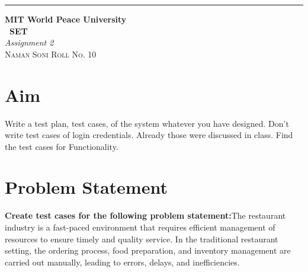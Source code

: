 \documentclass{article}
\begin{document}
\begin{titlepage} %
	
	\raggedleft\rule{1pt}{\textheight} %
	\hspace{0.05\textwidth} %
	\parbox[b]{0.75\textwidth}
	{ %
		
		{\Huge\bfseries MIT World Peace University \\[0.5\baselineskip] \ SET}\\[2\baselineskip] %
		{\large\textit{Assignment 2}}\\[4\baselineskip] %
		{\Large\textsc{Naman Soni Roll No. 10}} %
		
		\vspace{0.5\textheight} %
	}
	
\end{titlepage}
\tableofcontents
\pagebreak
\section{\textbf{Aim}}
Write a test plan, test cases, of the system whatever you have designed. Don’t write test cases of login credentials. Already those were discussed in class. Find the test cases for Functionality.
\section{\textbf{Problem Statement}}
\textbf{Create test cases for the following problem statement:}The restaurant industry is a fast-paced environment that requires efficient management of resources to ensure timely and quality service. In the traditional restaurant setting, the ordering process, food preparation, and inventory management are carried out manually, leading to errors, delays, and inefficiencies.
\end{document}
